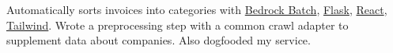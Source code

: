{Automatically sorts invoices into categories with \href{https://docs.aws.amazon.com/bedrock/latest/userguide/batch-inference.html}{Bedrock Batch}, \href{https://github.com/pallets/flask}{Flask}, \href{https://react.dev/}{React}, \href{https://tailwindcss.com/}{Tailwind}. Wrote a preprocessing step with a common crawl adapter to supplement data about companies. Also dogfooded my service.}
